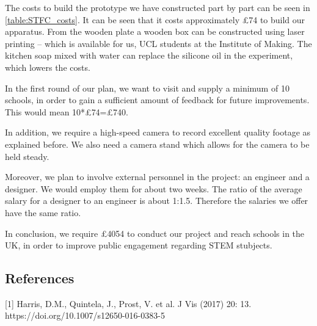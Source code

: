 The costs to build the prototype we have constructed part by part can be seen in \ref{table:STFC_costs}. It can be seen that it costs approximately {\pounds}74 to build our apparatus. From the wooden plate a wooden box can be constructed using laser printing -- which is available for us, UCL students at the Institute of Making. The kitchen soap mixed with water can replace the silicone oil in the experiment, which lowers the costs. 

In the first round of our plan, we want to visit and supply a minimum of 10 schools, in order to gain a sufficient amount of feedback for future improvements. This would mean 10*{\pounds}74={\pounds}740.

In addition, we require a high-speed camera to record excellent quality footage as explained before. We also need a camera stand which allows for the camera to be held steady.

Moreover, we plan to involve external personnel in the project: an engineer and a designer. We would employ them for about two weeks. The ratio of the average salary for a designer to an engineer is about 1:1.5. Therefore the salaries we offer have the same ratio.

In conclusion, we require {\pounds}4054 to conduct our project and reach schools in the UK, in order to improve public engagement regarding STEM stubjects.

\subsection{References}
[1] Harris, D.M., Quintela, J., Prost, V. et al. J Vis (2017) 20: 13. https://doi.org/10.1007/s12650-016-0383-5